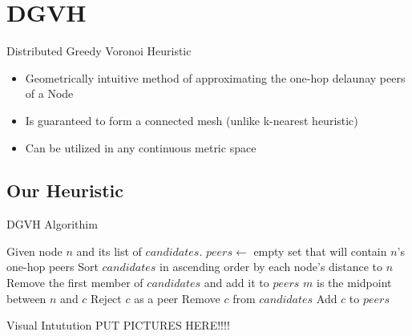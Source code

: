 \documentclass[8pt]{beamer}
\begin{document}
	
	

	
	\section{DGVH}
	\begin{frame}{Distributed Greedy Voronoi Heuristic}
		\begin{itemize}
			\item Geometrically intuitive method of approximating the one-hop delaunay peers of a Node
			\item Is guaranteed to form a connected mesh (unlike k-nearest heuristic)
			\item Can be utilized in any continuous metric space
		\end{itemize}
		
	\end{frame}
	
	\subsection{Our Heuristic}
	\begin{frame}{DGVH Algorithim}

		

			\begin{algorithmic}[1]  %
				\STATE Given node $n$ and its list of $candidates$.
				\STATE $peers \leftarrow$ empty set that will contain $n$'s one-hop peers
				\STATE Sort $candidates$ in ascending order by each node's distance to $n$
				\STATE Remove the first member of $candidates$ and add it to $peers$
				\STATE $m$ is the midpoint between $n$ and $c$
				\STATE Reject $c$ as a peer
				\ELSE
				\STATE Remove $c$ from $candidates$
				\STATE Add $c$ to $peers$
				\ENDIF
				\ENDFOR
			\end{algorithmic}

	\end{frame}
	\begin{frame}{Visual Intutution}
		PUT PICTURES HERE!!!!
	\end{frame}
\end{document}
